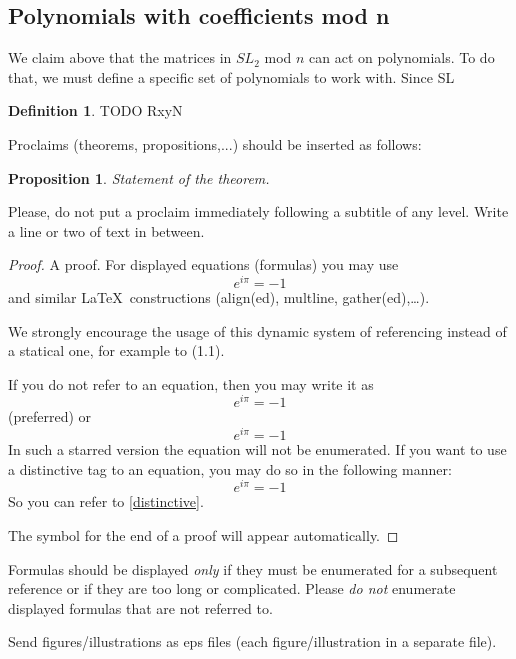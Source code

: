 \documentclass[a4paper,draft]{amsproc}
\theoremstyle{plain}
\newtheorem{prop}{Proposition}[section]
\theoremstyle{definition}
\newtheorem{dfn}{Definition}[section]
\theoremstyle{remark}
\numberwithin{equation}{section}
\begin{document}
\subsection{Polynomials with coefficients mod n}
We claim above that the matrices in $SL_{2}$ mod $n$ can act on polynomials. To do that, we must define a specific set of polynomials to work with. 
Since SL
\begin{dfn}
TODO RxyN
\end{dfn}

Proclaims (theorems, propositions,...) should be
inserted as follows:

\begin{prop}
Statement of the theorem.
\end{prop}

Please, do not put a proclaim immediately following a subtitle of any level.
Write a line or two of text in between.

\begin{proof}
A proof. For displayed equations (formulas) you may use
\begin{equation}\label{eq:a1b}
e^{i\pi}=-1
\end{equation}
and similar \LaTeX\ constructions (align(ed), multline, gather(ed),\dots).

We strongly encourage the usage of this dynamic system of referencing
instead of a statical one, for example to (1.1).

If you do not refer to an equation, then you may write it as
\[
e^{i\pi}=-1
\]
(preferred) or
\begin{equation*}
e^{i\pi}=-1
\end{equation*}
In such a starred version the equation will not be enumerated.
If you want to use a distinctive tag to an equation,
you may do so in the following manner:
\begin{equation}\label{distinctive}
e^{i\pi}=-1
\tag{$*$}
\end{equation}
So you can refer to \eqref{distinctive}.

The symbol for the end of a proof will appear automatically.
\end{proof}

Formulas should be displayed \emph{only}
if they must be enumerated for a subsequent reference
or if they are too long or complicated.
Please \emph{do not} enumerate displayed formulas that are not referred to.

Send figures/illustrations as eps files (each figure/illustration in a separate file).
\end{document}
